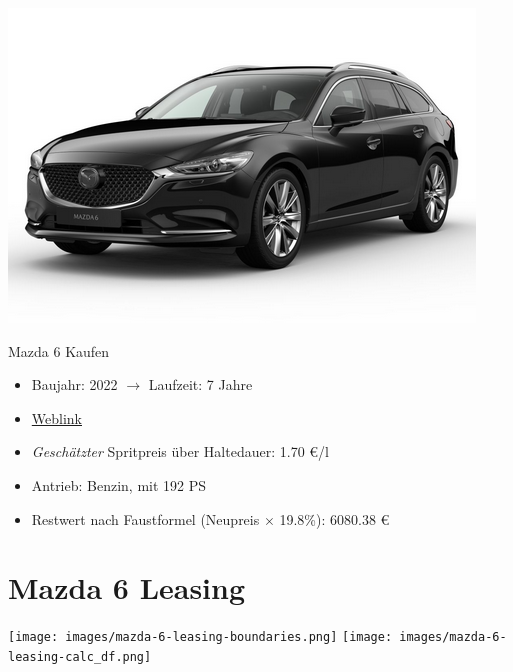 \documentclass[landscape, DIV=99, 14pt]{scrartcl}
\begin{document}
\pagebreak
\null
\vspace{2cm}
\begin{center}
\includegraphics[width=0.9\columnwidth]{cars/mazda-6-neu.png}

Mazda 6 Kaufen
\end{center}

\begin{itemize}
    \item Baujahr: 2022 $\rightarrow$ Laufzeit: 7 Jahre
    \item \href{https://konfigurator.meinauto.de/mazda/neuwagen/48-6/angebote/6-kombi/konfigurator/\#!/extras/exclusive-line/8846370/10,11/private/65352-5416-204698/984/61c9aa657e74c/cash-purchase/32545--287374/48,0,10000,0,0,0,0,0,}{Weblink}
    \item \emph{Gesch\"atzter} Spritpreis \"uber Haltedauer: 1.70 \euro{}/l
    \item Antrieb: Benzin, mit 192 PS
    \item Restwert nach Faustformel (Neupreis $\times$ 19.8\%): 6080.38 \euro{}
\end{itemize}

\pagebreak


\twocolumn

\section*{Mazda 6 Leasing}
\begin{center}
\texttt{[image: images/mazda-6-leasing-boundaries.png]}
\null
\vspace{0.5cm}
\texttt{[image: images/mazda-6-leasing-calc\_df.png]}
\end{center}
\end{document}
